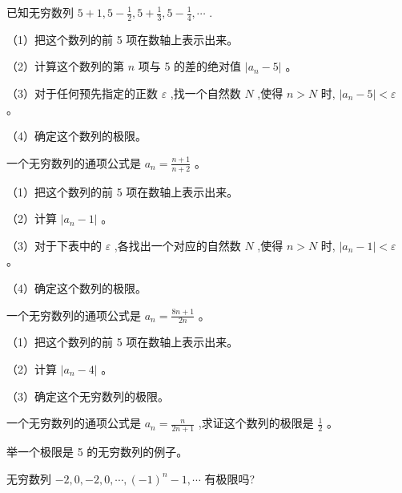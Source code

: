 \documentclass[lang=cn,newtx,12pt,scheme=chinese]{elegantbook}
\begin{document}
\begin{problemset}[习题一]
	\item 已知无穷数列 \(5 + 1,5 - \frac{1}{2},5 + \frac{1}{3},5 - \frac{1}{4},\cdots\) .
	
	（1）把这个数列的前 5 项在数轴上表示出来。
	
	（2）计算这个数列的第 \(n\) 项与 5 的差的绝对值 \(\left| {{a}_{n} - 5}\right|\) 。
	
	（3）对于任何预先指定的正数 \(\varepsilon\) ,找一个自然数 \(N\) ,使得 \(n > N\) 时, \(\left| {{a}_{n} - 5}\right| < \varepsilon\) 。
	
	（4）确定这个数列的极限。
	
	\item 一个无穷数列的通项公式是 \({a}_{n} = \frac{n + 1}{n + 2}\) 。
	
	（1）把这个数列的前 5 项在数轴上表示出来。
	
	（2）计算 \(\left| {{a}_{n} - 1}\right|\) 。
	
	（3）对于下表中的 \(\varepsilon\) ,各找出一个对应的自然数 \(N\) ,使得 \(n > N\) 时, \(\left| {{a}_{n} - 1}\right| < \varepsilon\) 。
	
	\begin{center}
	\end{center}
	
	（4）确定这个数列的极限。
	
	\item 一个无穷数列的通项公式是 \({a}_{n} = \frac{{8n} + 1}{2n}\) 。
	
	（1）把这个数列的前 5 项在数轴上表示出来。
	
	（2）计算 \(\left| {{a}_{n} - 4}\right|\) 。
	
	（3）确定这个无穷数列的极限。
	
	\item 一个无穷数列的通项公式是 \({a}_{n} = \frac{n}{{2n} + 1}\) ,求证这个数列的极限是 \(\frac{1}{2}\) 。
	
	\item 举一个极限是 5 的无穷数列的例子。
	
	\item 无穷数列 \(- 2,0, - 2,0,\cdots ,{\left( -1\right) }^{n} - 1,\cdots\) 有极限吗?
	

\end{problemset}
\end{document}
